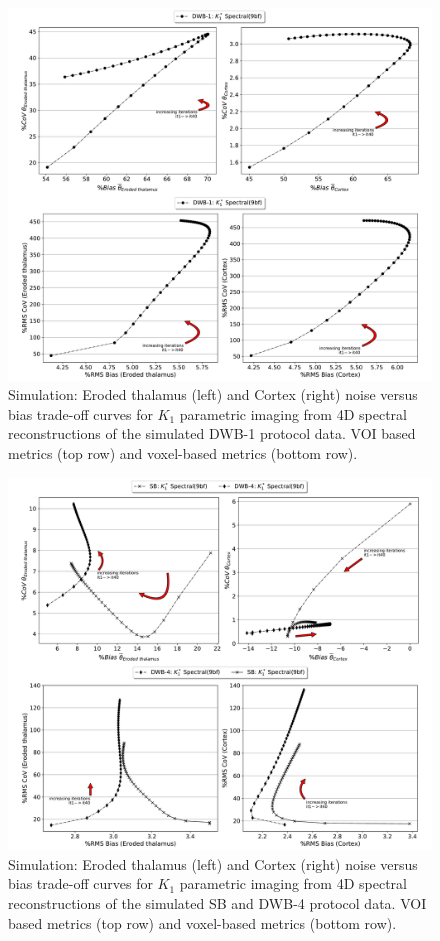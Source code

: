 \begin{figure} [ht!]
\centering
\includegraphics[scale=0.45,angle=0]{3_Results/3_2_Dynamic_Reconstruction_SimulationStudy/figures/VOI/K1_WB1.pdf}
\caption{Simulation: Eroded thalamus (left) and Cortex (right) noise versus bias trade-off curves for $K_1$ parametric imaging from 4D spectral reconstructions of the simulated DWB-1 protocol data. VOI based metrics (top row) and voxel-based metrics (bottom row).} 
\label{fig:K1_WB1}
\end{figure} 

\begin{figure} [ht!]
\centering
\includegraphics[scale=0.45,angle=0]{3_Results/3_2_Dynamic_Reconstruction_SimulationStudy/figures/VOI/K1_WB4.pdf}
\caption{Simulation: Eroded thalamus (left) and Cortex (right) noise versus bias trade-off curves for $K_1$ parametric imaging from 4D spectral reconstructions of the simulated SB and DWB-4 protocol data. VOI based metrics (top row) and voxel-based metrics (bottom row).} 
\label{fig:K1_SB_WB4}
\end{figure} 

